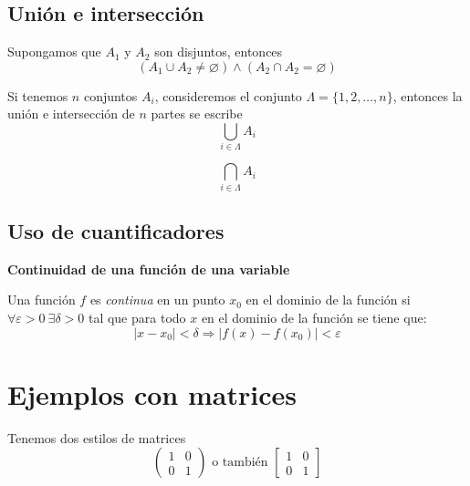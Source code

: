 \documentclass[letterpaper,twoside]{article}
\begin{document}
\subsection{Uni\'on e intersecci\'on}

Supongamos que $A_1$ y $A_2$ son disjuntos, entonces
$$
(A_1 \cup A_2 \neq \varnothing) \wedge (A_2 \cap A_2 = \varnothing)
$$

Si tenemos $n$ conjuntos $A_i$, consideremos el conjunto $\Lambda = \{1,2,\ldots , n\}$, entonces la uni\'on e intersecci\'on de $n$ partes se escribe
$$
\bigcup_{i\in \Lambda} A_i
$$

$$
\bigcap_{i\in \Lambda} A_i
$$

\subsection{Uso de cuantificadores}

\textbf{Continuidad de una funci\'on de una variable}

Una funci\'on $f$ es \emph{continua} en un punto $x_0$ en el dominio de la funci\'on
si $\forall \varepsilon > 0 \: \exists \delta> 0$ tal que para todo $x$ en el dominio de la funci\'on se tiene que:
$$|x-x_0|<\delta \Rightarrow |f(x)-f(x_0)|<\varepsilon$$

\newpage

\section{Ejemplos con matrices}

Tenemos dos estilos de matrices
$$
\begin{pmatrix}
1 & 0 \\
0 & 1
\end{pmatrix}
\text{ o tambi\'en }
\begin{bmatrix}
1 & 0 \\
0 & 1
\end{bmatrix}
$$
\end{document}
